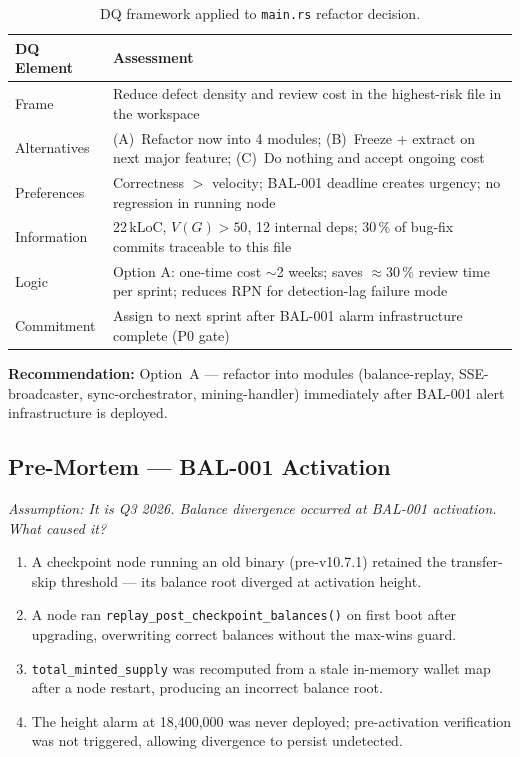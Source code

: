 \documentclass[12pt,a4paper]{article}
\begin{document}
\begin{table}[H]
\centering
\small
\begin{tabular}{lp{9.5cm}}
\toprule
\textbf{DQ Element} & \textbf{Assessment} \\
\midrule
Frame &
  Reduce defect density and review cost in the highest-risk file in the workspace \\
\rowcolor{rowgray}
Alternatives &
  (A)~Refactor now into 4 modules; (B)~Freeze + extract on next major feature;
  (C)~Do nothing and accept ongoing cost \\
Preferences &
  Correctness $>$ velocity; BAL-001 deadline creates urgency;
  no regression in running node \\
\rowcolor{rowgray}
Information &
  22\,kLoC, $V(G)>50$, 12 internal deps; 30\,\% of bug-fix commits
  traceable to this file \\
Logic &
  Option A: one-time cost $\sim$2 weeks; saves $\approx$30\,\% review time
  per sprint; reduces RPN for detection-lag failure mode \\
\rowcolor{rowgray}
Commitment &
  Assign to next sprint after BAL-001 alarm infrastructure complete (P0 gate) \\
\bottomrule
\end{tabular}
\caption{DQ framework applied to \texttt{main.rs} refactor decision.}
\end{table}

\textbf{Recommendation:} Option~A --- refactor into modules
(balance-replay, SSE-broadcaster, sync-orchestrator, mining-handler)
immediately after BAL-001 alert infrastructure is deployed.

\subsection{Pre-Mortem --- BAL-001 Activation}

\textit{Assumption: It is Q3 2026. Balance divergence occurred at BAL-001
activation. What caused it?}

\begin{enumerate}[leftmargin=*,itemsep=2pt]
  \item A checkpoint node running an old binary (pre-v10.7.1) retained the
    transfer-skip threshold --- its balance root diverged at activation height.
  \item A node ran \texttt{replay\_post\_checkpoint\_balances()} on first boot
    after upgrading, overwriting correct balances without the max-wins guard.
  \item \texttt{total\_minted\_supply} was recomputed from a stale in-memory
    wallet map after a node restart, producing an incorrect balance root.
  \item The height alarm at 18,400,000 was never deployed; pre-activation
    verification was not triggered, allowing divergence to persist undetected.
\end{enumerate}
\end{document}
